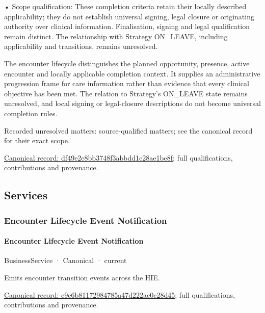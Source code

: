 •
Scope qualification: These completion criteria retain their locally described applicability; they do not establish universal signing, legal closure or originating authority over clinical information. Finalisation, signing and legal qualification remain distinct. The relationship with Strategy ON\_LEAVE, including applicability and transitions, remains unresolved.



The encounter lifecycle distinguishes the planned opportunity, presence, active encounter and locally applicable completion context. It supplies an administrative progression frame for care information rather than evidence that every clinical objective has been met. The relation to Strategy's ON\_LEAVE state remains unresolved, and local signing or legal-closure descriptions do not become universal completion rules.


{\small Recorded unresolved matters: source-qualified matters; see the canonical record for their exact scope.}\par
{\footnotesize \href{../../../../continuum/business/business-process/df49e2e8bb3748f3abbdd1c28ae1be8f.md}{Canonical record: df49e2e8bb3748f3abbdd1c28ae1be8f}; full qualifications, contributions and provenance.}\par
\subsection{Services}

\subsubsection{Encounter Lifecycle Event Notification}

\paragraph{Encounter Lifecycle Event Notification}

\label{element:e9c6b81172984785a47d222ac0c28d45}
{\small BusinessService · Canonical · current}\par

Emits encounter transition events across the HIE.


{\footnotesize \href{../../../../continuum/business/business-service/e9c6b81172984785a47d222ac0c28d45.md}{Canonical record: e9c6b81172984785a47d222ac0c28d45}; full qualifications, contributions and provenance.}\par

